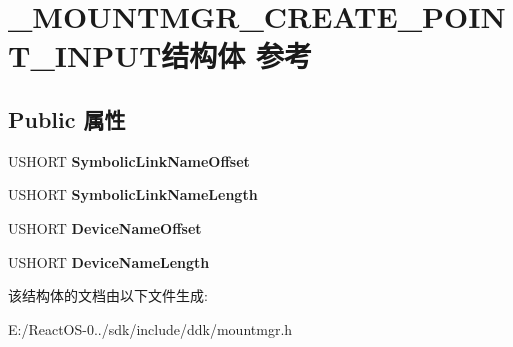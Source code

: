 \hypertarget{struct___m_o_u_n_t_m_g_r___c_r_e_a_t_e___p_o_i_n_t___i_n_p_u_t}{}\section{\+\_\+\+M\+O\+U\+N\+T\+M\+G\+R\+\_\+\+C\+R\+E\+A\+T\+E\+\_\+\+P\+O\+I\+N\+T\+\_\+\+I\+N\+P\+U\+T结构体 参考}
\label{struct___m_o_u_n_t_m_g_r___c_r_e_a_t_e___p_o_i_n_t___i_n_p_u_t}
\subsection*{Public 属性}
\begin{DoxyCompactItemize}
\item 
\mbox{\label{struct___m_o_u_n_t_m_g_r___c_r_e_a_t_e___p_o_i_n_t___i_n_p_u_t_a73b47b0b6fff172890eccd309f55d338}} 
U\+S\+H\+O\+RT {\bfseries Symbolic\+Link\+Name\+Offset}
\item 
\mbox{\label{struct___m_o_u_n_t_m_g_r___c_r_e_a_t_e___p_o_i_n_t___i_n_p_u_t_a4102a17c06ddaebf8fdcc21a4ce58776}} 
U\+S\+H\+O\+RT {\bfseries Symbolic\+Link\+Name\+Length}
\item 
\mbox{\label{struct___m_o_u_n_t_m_g_r___c_r_e_a_t_e___p_o_i_n_t___i_n_p_u_t_a649ad75d13f271dd35e7434e2b0fbf9d}} 
U\+S\+H\+O\+RT {\bfseries Device\+Name\+Offset}
\item 
\mbox{\label{struct___m_o_u_n_t_m_g_r___c_r_e_a_t_e___p_o_i_n_t___i_n_p_u_t_a9f1449af93769adbe1a3b2fca06d0240}} 
U\+S\+H\+O\+RT {\bfseries Device\+Name\+Length}
\end{DoxyCompactItemize}


该结构体的文档由以下文件生成\+:\begin{DoxyCompactItemize}
\item 
E\+:/\+React\+O\+S-\/0../sdk/include/ddk/mountmgr.\+h\end{DoxyCompactItemize}

